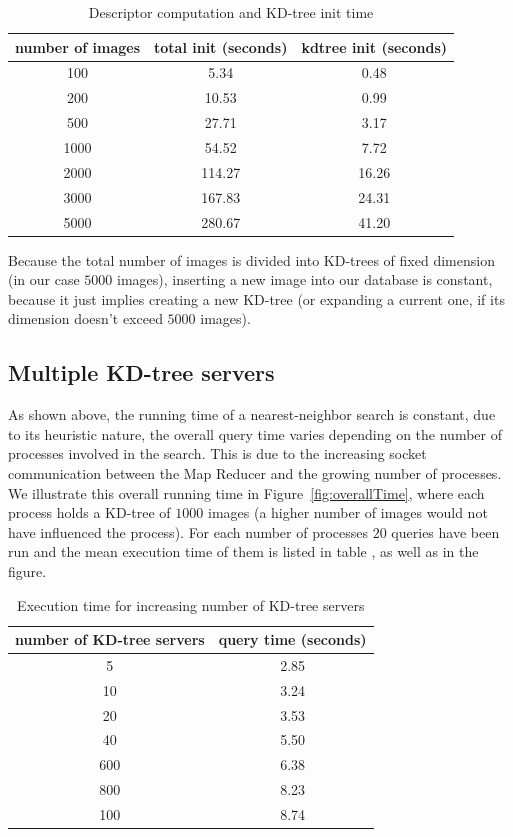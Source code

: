 \begin{table}[H]
\centering
\begin{tabular} {c | c | c}
	number of images & total init (seconds) & kdtree init (seconds) \\
	\hline
	100 & 5.34 & 0.48 \\
	200 & 10.53 & 0.99 \\
	500 & 27.71 & 3.17 \\
	1000 & 54.52 & 7.72 \\
	2000 & 114.27 & 16.26 \\
	3000 & 167.83 & 24.31 \\
	5000 & 280.67 & 41.20 \\
\end{tabular}
\caption{Descriptor computation and KD-tree init time}
\end{table}

Because the total number of images is divided into KD-trees of fixed dimension (in our case $5000$ images), inserting a new image into our database is constant, because it just implies creating a new KD-tree (or expanding a current one, if its dimension doesn't exceed $5000$ images).\\

\subsection{Multiple KD-tree servers}

As shown above, the running time of a nearest-neighbor search is constant, due to its heuristic nature, the overall query time varies depending on the number of processes involved in the search.
This is due to the increasing socket communication between the Map Reducer and the growing number of processes.
We illustrate this overall running time in Figure~\ref{fig:overallTime}, where each process holds a KD-tree of $1000$ images (a higher number of images would not have influenced the process). For each number of processes $20$ queries have been run and the mean execution time of them is listed in table , as well as in the figure.\\

\begin{table}[H]
\centering
\begin{tabular} {c | c}
	number of KD-tree servers & query time (seconds) \\
	\hline
	5 & 2.85\\
	10 & 3.24\\
	20 & 3.53\\
	40 & 5.50\\
	600 & 6.38\\
	800 & 8.23\\
	100 & 8.74\\
\end{tabular}
\caption{Execution time for increasing number of KD-tree servers}
\label{table:processTime}
\end{table}

